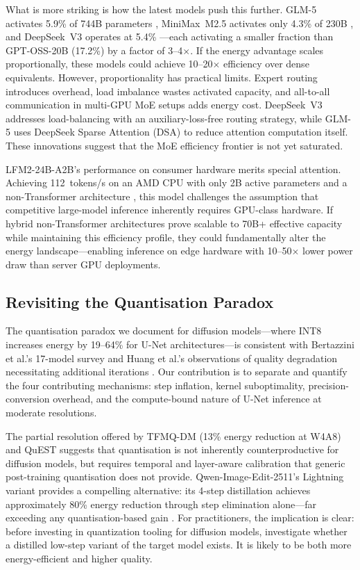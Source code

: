 \documentclass[AMS,STIX2COL]{WileyNJD-v2}
\begin{document}
What is more striking is how the latest models push this further. GLM-5 activates 5.9\% of 744B parameters \cite{zhipu2026glm5}, MiniMax~M2.5 activates only 4.3\% of 230B \cite{minimax2026m25}, and DeepSeek~V3 operates at 5.4\% \cite{deepseek2024v3}---each activating a smaller fraction than GPT-OSS-20B (17.2\%) by a factor of 3--4$\times$. If the energy advantage scales proportionally, these models could achieve 10--20$\times$ efficiency over dense equivalents. However, proportionality has practical limits. Expert routing introduces overhead, load imbalance wastes activated capacity, and all-to-all communication in multi-GPU MoE setups adds energy cost. DeepSeek~V3 addresses load-balancing with an auxiliary-loss-free routing strategy, while GLM-5 uses DeepSeek Sparse Attention (DSA) to reduce attention computation itself. These innovations suggest that the MoE efficiency frontier is not yet saturated.

LFM2-24B-A2B's performance on consumer hardware merits special attention. Achieving 112~tokens/s on an AMD CPU with only 2B active parameters and a non-Transformer architecture \cite{liquid2025lfm2}, this model challenges the assumption that competitive large-model inference inherently requires GPU-class hardware. If hybrid non-Transformer architectures prove scalable to 70B+ effective capacity while maintaining this efficiency profile, they could fundamentally alter the energy landscape---enabling inference on edge hardware with 10--50$\times$ lower power draw than server GPU deployments.

\subsection{Revisiting the Quantisation Paradox}

The quantisation paradox we document for diffusion models---where INT8 increases energy by 19--64\% for U-Net architectures---is consistent with Bertazzini et al.'s 17-model survey \cite{bertazzini2025hidden} and Huang et al.'s observations of quality degradation necessitating additional iterations \cite{huang2024tfmqdm}. Our contribution is to separate and quantify the four contributing mechanisms: step inflation, kernel suboptimality, precision-conversion overhead, and the compute-bound nature of U-Net inference at moderate resolutions.

The partial resolution offered by TFMQ-DM (13\% energy reduction at W4A8) and QuEST \cite{tseng2024quest} suggests that quantisation is not inherently counterproductive for diffusion models, but requires temporal and layer-aware calibration that generic post-training quantisation does not provide. Qwen-Image-Edit-2511's Lightning variant provides a compelling alternative: its 4-step distillation achieves approximately 80\% energy reduction through step elimination alone---far exceeding any quantisation-based gain \cite{wu2025qwenimage}. For practitioners, the implication is clear: before investing in quantization tooling for diffusion models, investigate whether a distilled low-step variant of the target model exists. It is likely to be both more energy-efficient and higher quality.
\end{document}
